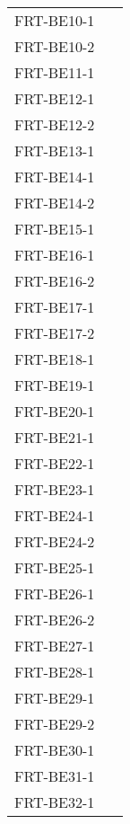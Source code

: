\documentclass[12pt, titlepage]{article}
\begin{document}
\begin{longtable}{p{} p{}}
	FRT-BE10-1            & ~                \\
	FRT-BE10-2            & ~                \\
	FRT-BE11-1            & ~                \\
	FRT-BE12-1            & ~                \\
	FRT-BE12-2            & ~                \\
	FRT-BE13-1            & ~                \\
	FRT-BE14-1            & ~                \\
	FRT-BE14-2            & ~                \\
	FRT-BE15-1            & ~                \\
	FRT-BE16-1            & ~                \\
	FRT-BE16-2            & ~                \\
	FRT-BE17-1            & ~                \\
	FRT-BE17-2            & ~                \\
	FRT-BE18-1            & ~                \\
	FRT-BE19-1            & ~                \\
	FRT-BE20-1            & ~                \\
	FRT-BE21-1            & ~                \\
	FRT-BE22-1            & ~                \\
	FRT-BE23-1            & ~                \\
	FRT-BE24-1            & ~                \\
	FRT-BE24-2            & ~                \\
	FRT-BE25-1            & ~                \\
	FRT-BE26-1            & ~                \\
	FRT-BE26-2            & ~                \\
	FRT-BE27-1            & ~                \\
	FRT-BE28-1            & ~                \\
	FRT-BE29-1            & ~                \\
	FRT-BE29-2            & ~                \\
	FRT-BE30-1            & ~                \\
	FRT-BE31-1            & ~                \\
	FRT-BE32-1            & ~                \\

\end{longtable}
\end{document}
